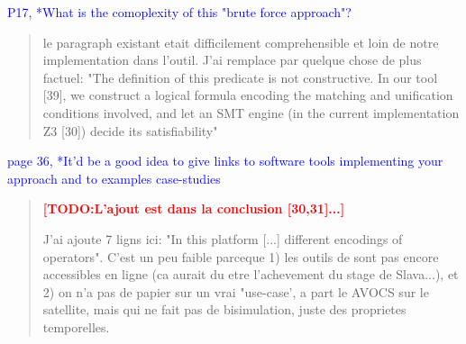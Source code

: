 \documentclass[10pt]{article}
\newcommand{\TODO}[1]{\textcolor{red}{\textbf{[TODO:#1]}}}
\newcommand{\ERIC}[1]{\textcolor{blue}{#1}}
\begin{document}
\ERIC{P17, *What is the comoplexity of this "brute force approach"?}
\begin{quote}
le paragraph existant etait difficilement comprehensible et loin de notre implementation dans l'outil. J'ai remplace par quelque chose de plus factuel:
"The definition of this predicate is not constructive. In our tool [39], we construct a logical formula encoding the matching and unification conditions involved, and let an SMT engine (in the current implementation Z3 [30]) decide its satisfiability"
\end{quote}

\ERIC{page 36, *It'd be a good idea to give links to software tools implementing your approach and to examples case-studies}
\begin{quote}
\TODO{L'ajout est dans la conclusion [30,31]...}

J'ai ajoute 7 ligns ici: "In this platform [...] different encodings of operators".
C'est un peu faible parceque 1) les outils de sont pas encore accessibles en ligne (ca aurait du etre l'achevement du stage de Slava...), et 2) on n'a pas de papier sur un vrai "use-case', a part le AVOCS sur le satellite, mais qui ne fait pas de bisimulation, juste des proprietes temporelles.
\end{quote}
\end{document}
